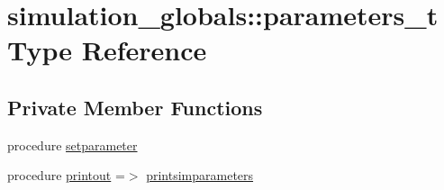 \hypertarget{structsimulation__globals_1_1parameters__t}{}\section{simulation\+\_\+globals\+:\+:parameters\+\_\+t Type Reference}
\label{structsimulation__globals_1_1parameters__t}
\subsection*{Private Member Functions}
\begin{DoxyCompactItemize}
\item 
procedure \mbox{\hyperlink{structsimulation__globals_1_1parameters__t_ad59ffcdf9208a52e7d3dae903197be74}{setparameter}}
\item 
procedure \mbox{\hyperlink{structsimulation__globals_1_1parameters__t_a6b56d89976f9cef3fef2e8f54fcb1bdf}{printout}} =$>$ \mbox{\hyperlink{namespacesimulation__globals_a0b17b2f2e9e7dbbad7c9d735217c1ee1}{printsimparameters}}
\end{DoxyCompactItemize}
